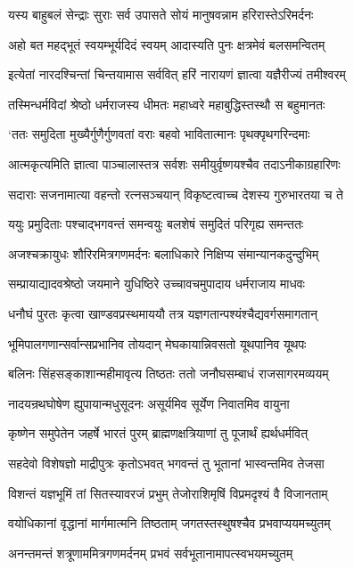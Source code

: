 \twolineshloka
{यस्य बाहुबलं सेन्द्राः सुराः सर्व उपासते}
{सोयं मानुषवन्नाम हरिरास्तेऽरिमर्दनः}


\twolineshloka
{अहो बत महद्भूतं स्वयम्भूर्यदिदं स्वयम्}
{आदास्यति पुनः क्षत्रमेवं बलसमन्वितम्}


\twolineshloka
{इत्येतां नारदश्चिन्तां चिन्तयामास सर्ववित्}
{हरिं नारायणं ज्ञात्वा यज्ञैरीज्यं तमीश्वरम्}


\twolineshloka
{तस्मिन्धर्मविदां श्रेष्ठो धर्मराजस्य धीमतः}
{महाध्वरे महाबुद्धिस्तस्थौ स बहुमानतः}


\twolineshloka
{`ततः समुदिता मुख्यैर्गुणैर्गुणवतां वराः}
{बहवो भावितात्मानः पृथक्पृथगरिन्दमाः}


\twolineshloka
{आत्मकृत्यमिति ज्ञात्वा पाञ्चालास्तत्र सर्वशः}
{समीयुर्वृष्णयश्चैव तदाऽनीकाग्रहारिणः}


\twolineshloka
{सदाराः सजनामात्या वहन्तो रत्नसञ्चयान्}
{विकृष्टत्वाच्च देशस्य गुरुभारतया च ते}


\twolineshloka
{ययुः प्रमुदिताः पश्चाद्भगवन्तं समन्वयुः}
{बलशेषं समुदितं परिगृह्य समन्ततः}


\twolineshloka
{अजश्चक्रायुधः शौरिरमित्रगणमर्दनः}
{बलाधिकारे निक्षिप्य संमान्यानकदुन्दुभिम्}


\twolineshloka
{सम्प्रायाद्यादवश्रेष्ठो जयमाने युधिष्ठिरे}
{उच्चावचमुपादाय धर्मराजाय माधवः}


\twolineshloka
{धनौघं पुरतः कृत्वा खाण्डवप्रस्थमाययौ}
{तत्र यज्ञगतान्पश्यंश्चैद्यवर्गसमागतान्}


\twolineshloka
{भूमिपालगणान्सर्वान्सप्रभानिव तोयदान्}
{मेघकायान्निवसतो यूथपानिव यूथपः}


\twolineshloka
{बलिनः सिंहसङ्काशान्महीमावृत्य तिष्ठतः}
{ततो जनौघसम्बाधं राजसागरमव्ययम्}


\twolineshloka
{नादयन्रथघोषेण ह्युपायान्मधुसूदनः}
{असूर्यमिव सूर्येण निवातमिव वायुना}


\twolineshloka
{कृष्णेन समुपेतेन जहर्षे भारतं पुरम्}
{ब्राह्मणक्षत्रियाणां तु पूजार्थं ह्यर्थधर्मवित्}


\twolineshloka
{सहदेवो विशेषज्ञो माद्रीपुत्रः कृतोऽभवत्}
{भगवन्तं तु भूतानां भास्वन्तमिव तेजसा}


\twolineshloka
{विशन्तं यज्ञभूमिं तां सितस्यावरजं प्रभुम्}
{तेजोराशिमृषिं विप्रमदृश्यं वै विजानताम्}


\twolineshloka
{वयोधिकानां वृद्धानां मार्गमात्मनि तिष्ठताम्}
{जगतस्तस्थुषश्चैव प्रभवाप्ययमच्युतम्}


\twolineshloka
{अनन्तमन्तं शत्रूणाममित्रगणमर्दनम्}
{प्रभवं सर्वभूतानामापत्स्वभयमच्युतम्}


